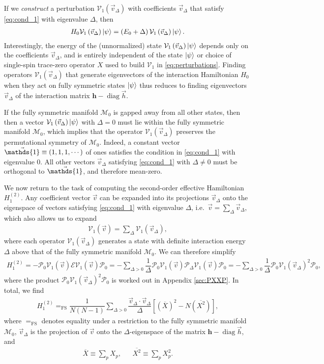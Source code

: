 \documentclass[nofootinbib,notitlepage,11pt]{revtex4-2}
\newcommand{\f}[2]{\dfrac{#1}{#2}} %
\newcommand{\p}[1]{\left(#1\right)} %
\renewcommand{\sp}[1]{\left[#1\right]} %
\renewcommand{\c}{\cdot} %
\newcommand{\m}{\bm} %
\renewcommand{\v}{\vec} %
\newcommand{\1}{\mathds{1}}
\newcommand{\E}{\mathcal{E}}
\newcommand{\M}{\mathcal{M}}
\renewcommand{\P}{\mathcal{P}}
\newcommand{\V}{\mathcal{V}}
\newcommand{\EQFS}{=_{\text{FS}}}
\newcommand{\col}{\overline}
\DeclareMathOperator{\diag}{diag}
\begin{document}
If we {\it construct} a perturbation $\V_1\p{\v v_\Delta}$ with
coefficients $\v v_\Delta$ that satisfy \eqref{eq:cond_1} with
eigenvalue $\Delta$, then
\begin{align}
  H_0 \V_1\p{\v v_\Delta} \ket\psi
  = \p{E_0 + \Delta} \V_1\p{\v v_\Delta} \ket\psi.
\end{align}
Interestingly, the energy of the (unnormalized) state
$\V_1\p{\v v_\Delta}\ket\psi$ depends only on the coefficients
$\v v_\Delta$, and is entirely independent of the state $\ket\psi$ or
choice of single-spin trace-zero operator $X$ used to build $\V_1$ in
\eqref{eq:perturbations}.  Finding operators $\V_1\p{\v v_\Delta}$
that generate eigenvectors of the interaction Hamiltonian $H_0$ when
they act on fully symmetric states $\ket\psi$ thus reduces to finding
eigenvectors $\v v_\Delta$ of the interaction matrix $\m h-\diag\v h$.

If the fully symmetric manifold $\M_0$ is gapped away from all other
states, then then a vector $\V_1\p{\v v_\Delta}\ket\psi$ with
$\Delta=0$ must lie within the fully symmetric manifold $\M_0$, which
implies that the operator $\V_1\p{\v v_\Delta}$ preserves the
permutational symmetry of $\M_0$.  Indeed, a constant vector
$\v\1\equiv\p{1,1,1,\cdots}$ of ones satisfies the condition in
\eqref{eq:cond_1} with eigenvalue $0$.  All other vectors
$\v v_\Delta$ satisfying \eqref{eq:cond_1} with $\Delta\ne0$ must be
orthogonal to $\v\1$, and therefore mean-zero.

We now return to the task of computing the second-order effective
Hamiltonian $H_1^{(2)}$.  Any coefficient vector $\v v$ can be
expanded into its projections $\v v_\Delta$ onto the eigenspace of
vectors satisfying \eqref{eq:cond_1} with eigenvalue $\Delta$,
i.e.~$\v v = \sum_\Delta \v v_\Delta$, which also allows us to expand
\begin{align}
  \V_1\p{\v v} = \sum_\Delta \V_1\p{\v v_\Delta},
\end{align}
where each operator $\V_1\p{\v v_\Delta}$ generates a state with
definite interaction energy $\Delta$ above that of the fully symmetric
manifold $\M_0$.  We can therefore simplify
\begin{align}
  H_1^{(2)}
  = - \P_0 \V_1\p{\v v} \E \V_1\p{\v v} \P_0
  = - \sum_{\Delta>0} \f1{\Delta}
  \P_0 \V_1\p{\v v} \P_\Delta \V_1\p{\v v} \P_0
  = - \sum_{\Delta>0} \f1{\Delta} \P_0 \V_1\p{\v v_\Delta}^2 \P_0,
\end{align}
where the product $\P_0 \V_1\p{\v v_\Delta}^2 \P_0$ is worked out in
Appendix \ref{sec:PXXP}.  In total, we find
\begin{align}
  H_1^{(2)}
  \EQFS \f1{N\p{N-1}}
  \sum_{\Delta>0} \f{\v v_\Delta\c\v v_\Delta}{\Delta}
  \sp{\p{\col{X}}^2 - N \p{\col{X^2}}},
  \label{eq:H_1_2}
\end{align}
where $\EQFS$ denotes equality under a restriction to the fully
symmetric manifold $\M_0$, $\v v_\Delta$ is the projection of $\v v$
onto the $\Delta$-eigenspace of the matrix $\m h-\diag\v h$, and
\begin{align}
  \col{X} \equiv \sum_p X_p,
  &&
  \col{X^2} \equiv \sum_p X_p^2.
\end{align}
\end{document}
